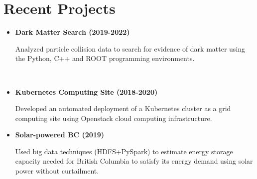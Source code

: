 \vspace{1.5em}
\section{Recent Projects}


\begin{minipage}[t]{0.48\textwidth}

\begin{itemize}
\item \textbf{Dark Matter Search (2019-2022)}

Analyzed particle collision data to search for evidence of dark matter using the Python, C++ and ROOT programming environments.

\end{itemize}

\end{minipage}
\hfill\
\begin{minipage}[t]{0.48\textwidth}

\begin{itemize}
\item \textbf{Kubernetes Computing Site (2018-2020)}

Developed an automated deployment of a Kubernetes cluster as a grid computing site using Openstack cloud computing infrastructure.

\end{itemize}
\vspace{0.5em}
\end{minipage}
\begin{minipage}[t]{0.48\textwidth}

\begin{itemize}
\item \textbf{Solar-powered BC (2019)}

Used big data techniques (HDFS+PySpark) to estimate energy storage capacity needed for British Columbia to satisfy its energy demand using solar power without curtailment.

\end{itemize}
\end{minipage}

